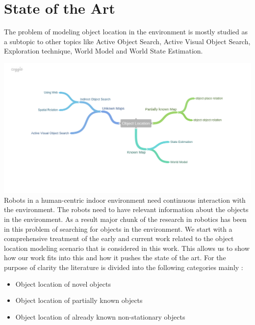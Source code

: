 \documentclass{llncs}
\begin{document}
%
\section{State of the Art}
The problem of modeling object location in the environment is mostly studied as a
subtopic to other topics like Active Object Search, Active Visual Object Search, Exploration technique, World Model and World State Estimation.

\includegraphics[width=\textwidth]{Object_Location.png}
Robots in a human-centric indoor environment need continuous interaction with
the environment. The robots need to have relevant information about the objects in the
environment. As a result major chunk of the research in robotics has been in this problem
of searching for objects in the environment. We start with a comprehensive treatment
of the early and current work related to the object location modeling scenario that is
considered in this work. This allows us to show how our work fits into this and how it
pushes the state of the art.
For the purpose of clarity the literature is divided into the following categories
mainly :
\begin{itemize}
\item Object location of novel objects
\item Object location of partially known objects 
\item Object location of already known non-stationary objects
\end{itemize}
\end{document}
